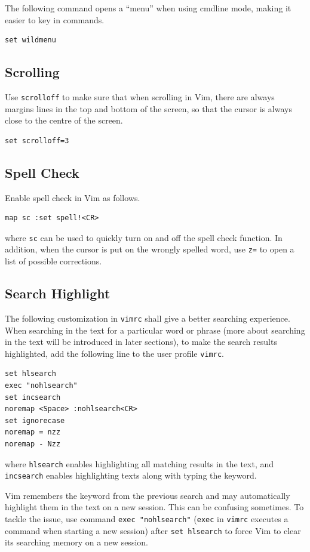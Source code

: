 The following command opens a ``menu'' when using cmdline mode, making it easier to key in commands.
\begin{lstlisting}
set wildmenu
\end{lstlisting}

\subsection{Scrolling}

Use \verb|scrolloff| to make sure that when scrolling in Vim, there are always margins lines in the top and bottom of the screen, so that the cursor is always close to the centre of the screen.
\begin{lstlisting}
set scrolloff=3
\end{lstlisting}

\subsection{Spell Check}

Enable spell check in Vim as follows.
\begin{lstlisting}
map sc :set spell!<CR>
\end{lstlisting}
where \verb|sc| can be used to quickly turn on and off the spell check function. In addition, when the cursor is put on the wrongly spelled word, use \verb|z=| to open a list of possible corrections.

\subsection{Search Highlight}

The following customization in \verb|vimrc| shall give a better searching experience. When searching in the text for a particular word or phrase (more about searching in the text will be introduced in later sections), to make the search results highlighted, add the following line to the user profile \verb|vimrc|.
\begin{lstlisting}
set hlsearch
exec "nohlsearch"
set incsearch
noremap <Space> :nohlsearch<CR>
set ignorecase
noremap = nzz
noremap - Nzz
\end{lstlisting}
where \verb|hlsearch| enables highlighting all matching results in the text, and \verb|incsearch| enables highlighting texts along with typing the keyword. 

Vim remembers the keyword from the previous search and may automatically highlight them in the text on a new session. This can be confusing sometimes. To tackle the issue, use command \verb|exec "nohlsearch"| (\verb|exec| in \verb|vimrc| executes a command when starting a new session) after \verb|set hlsearch| to force Vim to clear its searching memory on a new session. 

